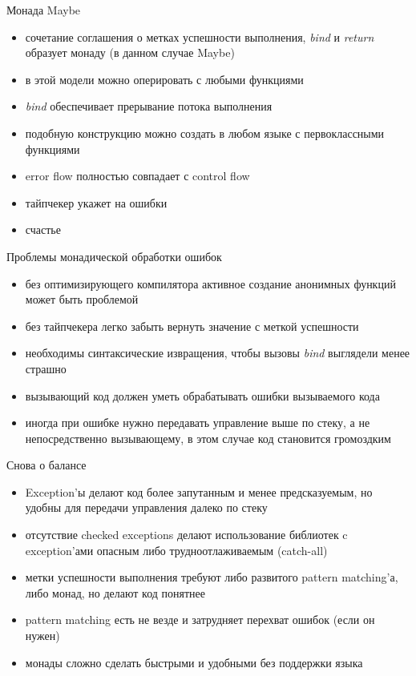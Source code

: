 \documentclass[10pt]{beamer}
\begin{document}
\begin{frame}{Монада Maybe}
  \begin{itemize}
  \item сочетание соглашения о метках успешности выполнения, \emph{bind} и \emph{return} образует монаду (в данном случае Maybe)
  \item в этой модели можно оперировать с любыми функциями
  \item \emph{bind} обеспечивает прерывание потока выполнения
  \item подобную конструкцию можно создать в любом языке с первоклассными функциями
  \item error flow полностью совпадает с control flow
  \item тайпчекер укажет на ошибки
  \item счастье
  \end{itemize}
\end{frame}

\begin{frame}{Проблемы монадической обработки ошибок}
  \begin{itemize}
  \item без оптимизирующего компилятора активное создание анонимных функций может быть проблемой
  \item без тайпчекера легко забыть вернуть значение с меткой успешности
  \item необходимы синтаксические извращения, чтобы вызовы \emph{bind} выглядели менее страшно
  \item вызывающий код должен уметь обрабатывать ошибки вызываемого кода
  \item иногда при ошибке нужно передавать управление выше по стеку, а не непосредственно вызывающему, в этом случае код становится громоздким
  \end{itemize}
\end{frame}

\begin{frame}{Снова о балансе}
  \begin{itemize}
  \item Exception'ы делают код более запутанным и менее предсказуемым, но удобны для передачи управления далеко по стеку
  \item отсутствие checked exceptions делают использование библиотек c exception'ами опасным либо трудноотлаживаемым (catch-all)
  \item метки успешности выполнения требуют либо развитого pattern matching'а, либо монад, но делают код понятнее
  \item pattern matching есть не везде и затрудняет перехват ошибок (если он нужен)
  \item монады сложно сделать быстрыми и удобными без поддержки языка
  \end{itemize}
\end{frame}
\end{document}
